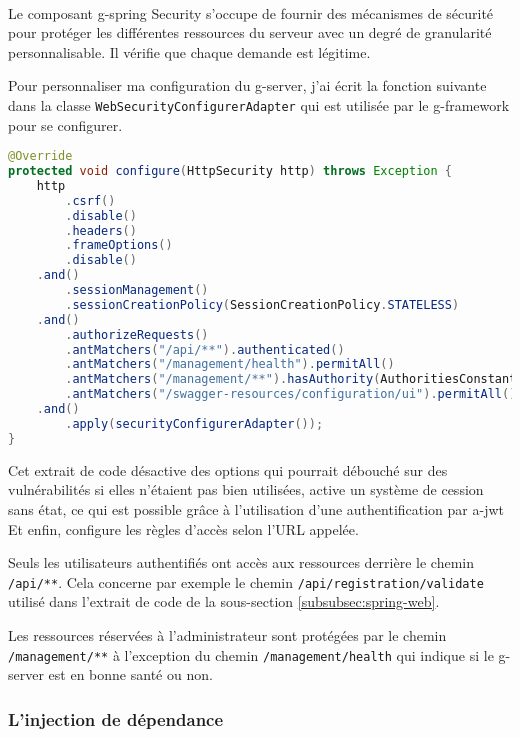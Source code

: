 \paragraph{}
Le composant \gls{g-spring} Security s'occupe de fournir des mécanismes de sécurité pour protéger les différentes ressources du serveur avec un degré de granularité personnalisable.
Il vérifie que chaque demande est légitime.

Pour personnaliser ma configuration du \gls{g-server}, j'ai écrit la fonction suivante dans la classe \lstinline{WebSecurityConfigurerAdapter} qui est utilisée par le \gls{g-framework} pour se configurer.
\begin{lstlisting}[language=Java]
@Override
protected void configure(HttpSecurity http) throws Exception {
    http
        .csrf()
        .disable()
        .headers()
        .frameOptions()
        .disable()
    .and()
        .sessionManagement()
        .sessionCreationPolicy(SessionCreationPolicy.STATELESS)
    .and()
        .authorizeRequests()
        .antMatchers("/api/**").authenticated()
        .antMatchers("/management/health").permitAll()
        .antMatchers("/management/**").hasAuthority(AuthoritiesConstants.ADMIN)
        .antMatchers("/swagger-resources/configuration/ui").permitAll()
    .and()
        .apply(securityConfigurerAdapter());
}
\end{lstlisting}
Cet extrait de code désactive des options qui pourrait débouché sur des vulnérabilités si elles n'étaient pas bien utilisées\cite{noauthor_cross-site_nodate},
active un système de cession sans état\fnmark{}, ce qui est possible grâce à l'utilisation d'une authentification par \gls{a-jwt}
Et enfin, configure les règles d'accès selon l'URL appelée.

Seuls les utilisateurs authentifiés ont accès aux ressources derrière le chemin \lstinline{/api/**}.
Cela concerne par exemple le chemin \lstinline{/api/registration/validate} utilisé dans l'extrait de code de la sous-section \ref{subsubsec:spring-web}.

Les ressources réservées à l'administrateur sont protégées par le chemin \lstinline{/management/**} à l'exception du chemin \lstinline{/management/health} qui indique si le \gls{g-server} est en bonne santé ou non.

\subsubsection{L'injection de dépendance}
\label{subsubsec:dependency-injection}

